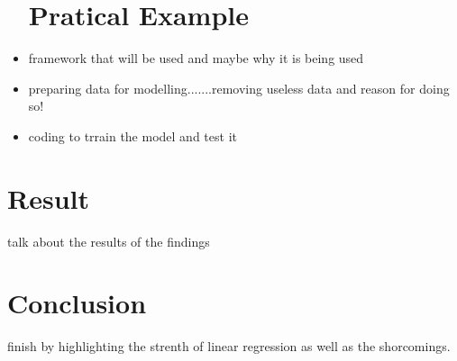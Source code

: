 \documentclass[conference]{IEEEtran}
\begin{document}
\begin{itemize}
\section{Pratical Example}
\item framework that will be used and maybe why it is being used
\item preparing data for modelling.......removing useless data and reason for doing so!
\item coding to trrain the model and test it
\end{itemize}
\section{Result}
talk about the results of the findings

\section{Conclusion}
finish by highlighting the strenth of linear regression as well as the shorcomings.
\end{document}

